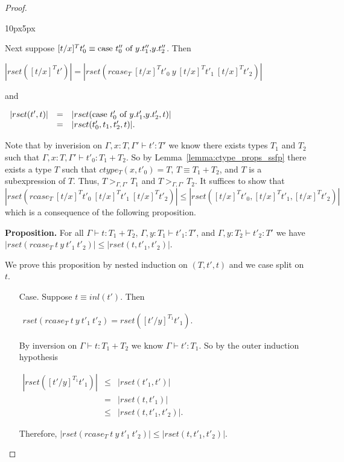 \begin{proof}
\begin{changemargin}{10px}{5px}
\begin{itemize}
  Next suppose $[t/x]^T t'_0 \equiv \mbox{case}\ t''_0\ \text{of}\ y\text{.}t''_1\text{,}y\text{.}t''_2$.  Then 
  \begin{center}
    \begin{math}
      |rset([t/x]^T t')| = |rset(rcase_{T}\ [t/x]^T t'_0\ y\ [t/x]^T t'_1\ [t/x]^T t'_2)|
    \end{math}
  \end{center}
  and
  \begin{center}
    \begin{math}
      \begin{array}{lll}
        |rset(t', t)| & = & |rset(\mbox{case}\ t'_0\ \text{of}\ y\text{.}t'_1\text{,}y\text{.}t'_2, t)|\\
        & = & |rset(t'_0,t_1,t'_2,t)|.
      \end{array}
    \end{math}
  \end{center}
  Note that by inverision on $\Gamma,x:T,\Gamma' \vdash t':T'$ we know there exists
  types $T_1$ and $T_2$ such that $\Gamma,x:T,\Gamma' \vdash t'_0:T_1+T_2$.
  So by Lemma~\ref{lemma:ctype_props_ssfp} there exists a type $T$ such that $ctype_T (x,t'_0) = T$, $T \equiv T_1+T_2$, and $T$ is a 
  subexpression of $T$. Thus, $T >_{\Gamma,\Gamma'} T_1$ and $T >_{\Gamma,\Gamma'} T_2$.
  It suffices to show that $|rset(rcase_T\ [t/x]^T t'_0\ [t/x]^T t'_1\ [t/x]^T t'_2)| \leq |rset([t/x]^T t'_0, [t/x]^T t'_1, [t/x]^T t'_2)|$ which
  is a consequence of the following proposition.
      
  {\bf Proposition.}  For all $\Gamma \vdash t:T_1+T_2$, $\Gamma, y:T_1 \vdash t'_1:T'$, and 
  $\Gamma, y:T_2 \vdash t'_2:T'$ we have $|rset(rcase_{T}\ t\ y\ t'_1\ t'_2)| \leq |rset(t, t'_1, t'_2)|$.
      
  We prove this proposition by nested induction on $(T, t', t)$ and we case split on $t$.
  \begin{itemize}
  \item[Case.] Suppose $t \equiv inl(t')$.  Then
    \begin{center}
      \begin{math}
        \begin{array}{lll}
          rset(rcase_{T}\ t\ y\ t'_1\ t'_2) = rset([t'/y]^{T_1} t'_1).
        \end{array}
      \end{math}
    \end{center}
    By inversion on $\Gamma \vdash t:T_1+T_2$ we know $\Gamma \vdash t':T_1$.  So by the outer induction
    hypothesis 
    \begin{center}
      \begin{math}
        \begin{array}{lll}
          |rset([t'/y]^{T_1}t'_1)| & \leq & |rset(t'_1,t')|\\
          & =    & |rset(t,t'_1)|\\
          & \leq & |rset(t,t'_1,t'_2)|.
        \end{array}
      \end{math}
    \end{center}
    Therefore, $|rset(rcase_{T}\ t\ y\ t'_1\ t'_2)| \leq |rset(t,t'_1,t'_2)|$.


\end{itemize}
\end{itemize}
\end{changemargin}
\end{proof}
